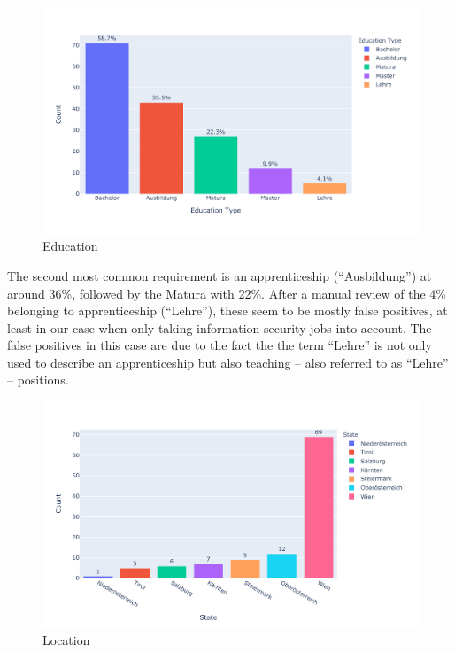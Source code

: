 \documentclass[runningheads]{llncs}
\newcommand{\german}[1]{{#1}}
\begin{document}
\begin{figure}[H]
	\centering
  \includegraphics[width=\textwidth]{education-bar-chart.pdf}
	\caption{Education}
	\label{fig:education_chart}
\end{figure}

The second most common requirement is an apprenticeship (“\german{Ausbildung}”) at around 36\%, followed by the Matura with 22\%. After a manual review of the 4\% belonging to apprenticeship (“\german{Lehre}”), these seem to be mostly false positives, at least in our case when only taking information security jobs into account. The false positives in this case are due to the fact the the term “\german{Lehre}” is not only used to describe an apprenticeship but also teaching -- also referred to as “\german{Lehre}” -- positions.

\begin{figure}[H]
	\centering
  \includegraphics[width=\textwidth]{location-bar-chart.pdf}
	\caption{Location}
	\label{fig:location_chart}
\end{figure}
\end{document}

